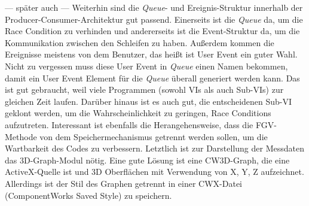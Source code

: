 --- später auch ---
Weiterhin sind die \textit{Queue}- und Ereignis-Struktur innerhalb der Producer-Consumer-Architektur gut passend. Einerseits ist die \textit{Queue} da, um die Race Condition zu verhinden und andererseits ist die Event-Struktur da, um die Kommunikation zwischen den Schleifen zu haben. Außerdem kommen die Ereignisse meistens von dem Benutzer, das heißt ist User Event ein guter Wahl. Nicht zu vergessen muss diese User Event in \textit{Queue} einen Namen bekommen, damit ein User Event Element für die \textit{Queue} überall generiert werden kann. Das ist gut gebraucht, weil viele Programmen (sowohl VIs als auch Sub-VIs) zur gleichen Zeit laufen. Darüber hinaus ist es auch gut, die entscheidenen Sub-VI geklont werden, um die Wahrscheinlichkeit zu geringen, Race Conditions aufzutreten. Interessant ist ebenfalls die Herangehensweise, dass die FGV-Methode von dem Speichermechanismus getrennt werden sollen, um die Wartbarkeit des Codes zu verbessern. Letztlich ist zur Darstellung der Messdaten das 3D-Graph-Modul nötig. Eine gute Lösung ist eine CW3D-Graph, die eine ActiveX-Quelle ist und 3D Oberflächen mit Verwendung von X, Y, Z aufzeichnet. Allerdings ist der Stil des Graphen getrennt in einer CWX-Datei (ComponentWorks Saved Style) zu speichern.
\fi